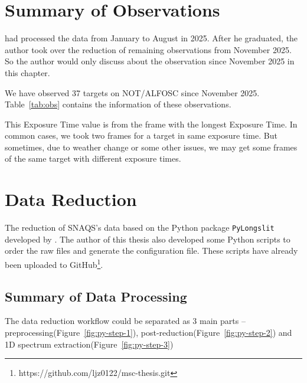\section{Summary of Observations}

\citet{kris-msc} had processed the data from January to August in 2025. After he graduated, the author took over the reduction of remaining observations from November 2025. So the author would only discuss about the observation since November 2025 in this chapter.

We have observed \num{37} targets on NOT/ALFOSC since November 2025. Table~\ref{tab:obs} contains the information of these observations.

\begin{ThreePartTable}
    \begin{TableNotes}\footnotesize
        \item[a] This Exposure Time value is from the frame with the longest Exposure Time. In common cases, we took two frames for a target in same exposure time. But sometimes, due to weather change or some other issues, we may get some frames of the same target with different exposure times.
    \end{TableNotes}
    
\end{ThreePartTable}

\section{Data Reduction}

The reduction of SNAQS's data based on the Python package \texttt{PyLongslit} developed by \citet{valeckas_pylongslit_2025}. The author of this thesis also developed some Python scripts to order the raw files and generate the configuration file. These scripts have already been uploaded to GitHub\footnote{https://github.com/ljz0122/msc-thesis.git}.

\subsection{Summary of Data Processing}

The data reduction workflow could be separated as 3 main parts -- preprocessing(Figure~\ref{fig:py-step-1}), post-reduction(Figure~\ref{fig:py-step-2}) and 1D spectrum extraction(Figure~\ref{fig:py-step-3})

